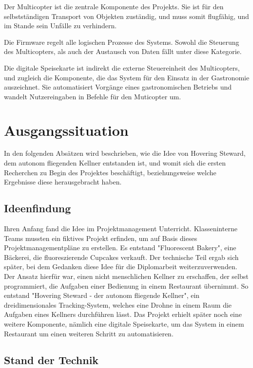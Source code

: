 Der Multicopter ist die zentrale Komponente des Projekts. Sie ist für den selbstständigen Transport von Objekten zuständig,
und muss somit flugfähig, und im Stande sein Unfälle zu verhindern.

Die Firmware regelt alle logischen Prozesse des Systems. Sowohl die Steuerung des Multicopters, als auch der
Austausch von Daten fällt unter diese Kategorie.

Die digitale Speisekarte ist indirekt die externe Steuereinheit des Multicopters, und zugleich die Komponente,
die das System für den Einsatz in der Gastronomie auszeichnet. Sie automatisiert Vorgänge eines gastronomischen
Betriebs und wandelt Nutzereingaben in Befehle für den Muticopter um.

\section{Ausgangssituation}
  In den folgenden Absätzen wird beschrieben, wie die Idee von Hovering Steward, dem autonom fliegenden Kellner
  entstanden ist, und womit sich die ersten Recherchen zu Begin des Projektes beschäftigt, beziehungsweise
  welche Ergebnisse diese herausgebracht haben.

  \subsection{Ideenfindung}
  Ihren Anfang fand die Idee im Projektmanagement Unterricht. Klasseninterne Teams mussten ein fiktives Projekt erfinden, um auf Basis dieses
  Projektmanagementpläne zu erstellen. Es entstand "Fluorescent Bakery", eine Bäckerei, die fluoreszierende Cupcakes verkauft.
  Der technische Teil ergab sich später, bei dem Gedanken diese Idee für die Diplomarbeit weiterzuverwenden. Der Ansatz hierfür war,
  einen nicht menschlichen Kellner zu erschaffen, der selbst programmiert, die Aufgaben einer Bedienung in einem Restaurant übernimmt.
  So entstand "Hovering Steward - der autonom fliegende Kellner", ein dreidimensionales Tracking-System, welches eine Drohne in einem Raum die Aufgaben eines Kellners durchführen lässt.
  Das Projekt erhielt später noch eine weitere Komponente, nämlich eine digitale Speisekarte, um das System in einem Restaurant um einen weiteren Schritt zu automatisieren.

  \subsection{Stand der Technik}
